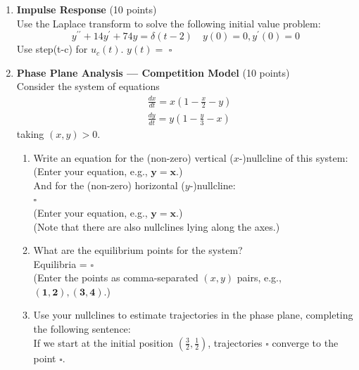 \begin{enumerate}
  \item \textbf{Impulse Response} (10 points)\\
  Use the Laplace transform to solve the following initial value problem:
  $$
  y^{\prime \prime}+14 y^{\prime}+74 y=\delta(t-2) \quad y(0)=0, y^{\prime}(0)=0
  $$
  Use step(t-c) for $u_c(t)$. $y(t)=$ $\square$\\
  \begin{subanswer}
  \end{subanswer}

  \newpage

  \item \textbf{Phase Plane Analysis --- Competition Model} (10 points)\\
  Consider the system of equations
  $$
  \begin{aligned}
  & \frac{d x}{d t}=x\left(1-\frac{x}{2}-y\right) \\
  & \frac{d y}{d t}=y\left(1-\frac{y}{3}-x\right)
  \end{aligned}
  $$
  taking $(x, y)>0$.
  \begin{enumerate}[label=(\alph*)]
    \item Write an equation for the (non-zero) vertical ($x$-)nullcline of this system:\\
    (Enter your equation, e.g., $\boldsymbol{y}=\boldsymbol{x}$.)\\
    And for the (non-zero) horizontal ($y$-)nullcline:\\
    $\square$\\
    (Enter your equation, e.g., $\boldsymbol{y}=\boldsymbol{x}$.)\\
    (Note that there are also nullclines lying along the axes.)\\
    \begin{subanswer}
    \end{subanswer}
    \item What are the equilibrium points for the system?\\
    Equilibria = $\square$\\
    (Enter the points as comma-separated $(x, y)$ pairs, e.g., $(\mathbf{1 , 2}),(\mathbf{3 , 4})$.)\\
    \begin{subanswer}
    \end{subanswer}
    \item Use your nullclines to estimate trajectories in the phase plane, completing the following sentence:\\
    If we start at the initial position $\left(\frac{3}{2}, \frac{1}{2}\right)$, trajectories $\square$ converge to the point $\square$.\\
    \begin{subanswer}
    \end{subanswer}
  \end{enumerate}


\end{enumerate}
